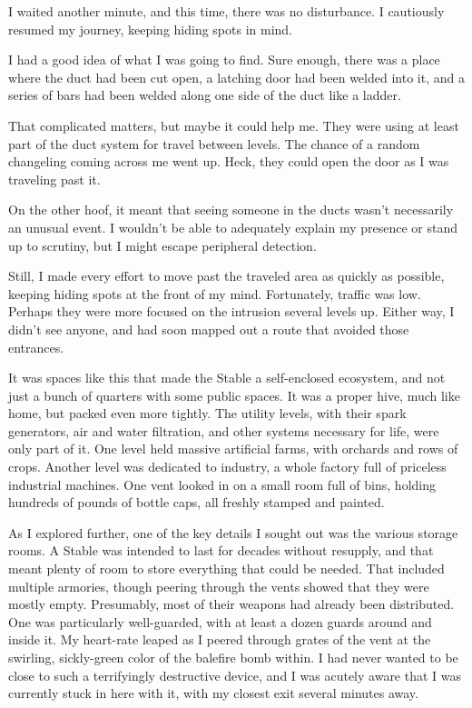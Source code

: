 I waited another minute, and this time, there was no disturbance. I cautiously resumed my journey, keeping hiding spots in mind.

I had a good idea of what I was going to find. Sure enough, there was a place where the duct had been cut open, a latching door had been welded into it, and a series of bars had been welded along one side of the duct like a ladder.

That complicated matters, but maybe it could help me. They were using at least part of the duct system for travel between levels. The chance of a random changeling coming across me went up. Heck, they could open the door as I was traveling past it.

On the other hoof, it meant that seeing someone in the ducts wasn’t necessarily an unusual event. I wouldn’t be able to adequately explain my presence or stand up to scrutiny, but I might escape peripheral detection.

Still, I made every effort to move past the traveled area as quickly as possible, keeping hiding spots at the front of my mind. Fortunately, traffic was low. Perhaps they were more focused on the intrusion several levels up. Either way, I didn’t see anyone, and had soon mapped out a route that avoided those entrances.

It was spaces like this that made the Stable a self-enclosed ecosystem, and not just a bunch of quarters with some public spaces. It was a proper hive, much like home, but packed even more tightly. The utility levels, with their spark generators, air and water filtration, and other systems necessary for life, were only part of it. One level held massive artificial farms, with orchards and rows of crops. Another level was dedicated to industry, a whole factory full of priceless industrial machines. One vent looked in on a small room full of bins, holding hundreds of pounds of bottle caps, all freshly stamped and painted.

As I explored further, one of the key details I sought out was the various storage rooms. A Stable was intended to last for decades without resupply, and that meant plenty of room to store everything that could be needed. That included multiple armories, though peering through the vents showed that they were mostly empty. Presumably, most of their weapons had already been distributed. One was particularly well-guarded, with at least a dozen guards around and inside it. My heart-rate leaped as I peered through grates of the vent at the swirling, sickly-green color of the balefire bomb within. I had never wanted to be close to such a terrifyingly destructive device, and I was acutely aware that I was currently stuck in here with it, with my closest exit several minutes away.

